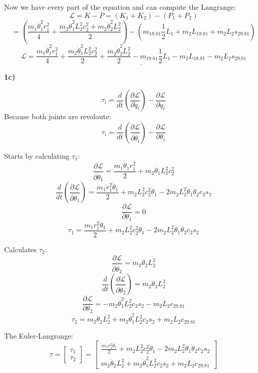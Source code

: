 \documentclass[12pt,norsk,a4paper]{article}
\begin{document}
    Now we have every part of the equation and can compute the Langrange:\\
    \[\mathcal{L} = K-P = (K_1+K_2)-(P_1+P_2)\]
    \[=(\frac{m_1\dot\theta_1^2r_1^2}{4} + \frac{m_2\dot\theta_1^2L_2^2c_2^2+m_2\dot\theta_2^2L_2^2}{2})-(m_19.81\frac{1}{2}L_1+m_2L_19.81+m_2L_2s_29.81)\]
    \[\mathcal{L} = \underline{\frac{m_1\dot\theta_1^2r_1^2}{4} + \frac{m_2\dot\theta_1^2L_2^2c_2^2}{2}+\frac{m_2\dot\theta_2^2L_2^2}{2}-m_19.81\frac{1}{2}L_1-m_2L_19.81-m_2L_2s_29.81}\]
    \newpage








    
    \textbf{1c)}

    \[\tau_i = \frac{d}{dt}\left(\frac{\partial\mathcal{L}}{\partial\dot q_i}\right)-\frac{\partial\mathcal{L}}{\partial q_i}\]
    Because both joints are revoloute:\\
    \[\tau_i = \frac{d}{dt}\left(\frac{\partial\mathcal{L}}{\partial\dot \theta_i}\right)-\frac{\partial\mathcal{L}}{\partial\theta_i}\]
    
    Starts by calculating $\tau_1$:\\
    \[\frac{\partial\mathcal{L}}{\partial\dot \theta_1} = 
    \frac{m_1\dot\theta_1r_1^2}{2}+m_2\dot\theta_1L_2^2c_2^2\]
    \[\frac{d}{dt}\left(\frac{\partial\mathcal{L}}{\partial\dot\theta_1}\right)= \frac{m_1r_1^2\ddot\theta_1}{2} + m_2L_2^2c_2^2\ddot\theta_1 - 2m_2L_2^2\dot\theta_1\dot\theta_2c_2s_2\]
    \[\frac{\partial\mathcal{L}}{\partial \theta_1} = 0\]
    \[\tau_1 =\frac{m_1r_1^2\ddot\theta_1}{2} + m_2L_2^2c_2^2\ddot\theta_1 - 2m_2L_2^2\dot\theta_1\dot\theta_2c_2s_2\]

    Calculates $\tau_2$:\\
    \[\frac{\partial\mathcal{L}}{\partial\dot \theta_2} = m_2\dot\theta_2L_2^2\]
    \[\frac{d}{dt}\left(\frac{\partial\mathcal{L}}{\partial\dot\theta_2}\right)= m_2 \ddot\theta_2 L_2^2\]
    \[\frac{\partial\mathcal{L}}{\partial \theta_2} = -m_2\dot \theta_1^2L_2^2c_2s_2-m_2L_2c_29.81\]
    \[\tau_2 =  m_2 \ddot\theta_2 L_2^2 + m_2\dot \theta_1^2L_2^2c_2s_2 + m_2L_2c_29.81\]
    
    The Euler-Langrange:\\
    \[\tau = \left[\begin{array}{c} \tau_1 \\ \tau_2\end{array}\right]
    = \left[\begin{array}{c}
        \frac{m_1r_1^2\ddot\theta_1}{2} + m_2L_2^2c_2^2\ddot\theta_1 - 2m_2L_2^2\dot\theta_1\dot\theta_2c_2s_2\\
        m_2 \ddot\theta_2 L_2^2 + m_2\dot \theta_1^2L_2^2c_2s_2 + m_2L_2c_29.81
    \end{array}\right]\]
\end{document}
